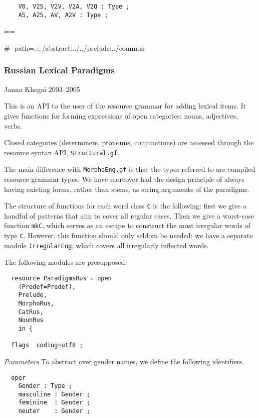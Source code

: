 \documentclass[11pt,a4paper]{article}
\newcommand{\commOut}[1]{}
\newcommand{\subsubsubsection}[1]{\textit{#1}}
\begin{document}
\begin{verbatim}
    V0, V2S, V2V, V2A, V2Q : Type ;
    AS, A2S, AV, A2V : Type ;
\end{verbatim}

\commOut{Produced by 
gfdoc - a rudimentary GF document generator.
(c) Aarne Ranta (\htmladdnormallink{aarne@cs.chalmers.se}{mailto:aarne@cs.chalmers.se}) 2002 under GNU GPL.}

==

\# -path=.:../abstract:../../prelude:../common


\subsubsection{Russian Lexical Paradigms}
Janna Khegai 2003--2005

This is an API to the user of the resource grammar 
for adding lexical items. It gives functions for forming
expressions of open categories: nouns, adjectives, verbs.

Closed categories (determiners, pronouns, conjunctions) are
accessed through the resource syntax API, \texttt{Structural.gf}. 

The main difference with \texttt{MorphoEng.gf} is that the types
referred to are compiled resource grammar types. We have moreover
had the design principle of always having existing forms, rather
than stems, as string arguments of the paradigms.

The structure of functions for each word class \texttt{C} is the following:
first we give a handful of patterns that aim to cover all
regular cases. Then we give a worst-case function \texttt{mkC}, which serves as an
escape to construct the most irregular words of type \texttt{C}.
However, this function should only seldom be needed: we have a
separate module \texttt{IrregularEng}, which covers all irregularly inflected
words.

The following modules are presupposed:

\begin{verbatim}
  resource ParadigmsRus = open 
    (Predef=Predef), 
    Prelude, 
    MorphoRus,
    CatRus,
    NounRus
    in {
  
  flags  coding=utf8 ;
\end{verbatim}

\subsubsubsection{Parameters}
To abstract over gender names, we define the following identifiers.

\begin{verbatim}
  oper
    Gender : Type ;
    masculine : Gender ;
    feminine  : Gender ;
    neuter    : Gender ;
\end{verbatim}
\end{document}
